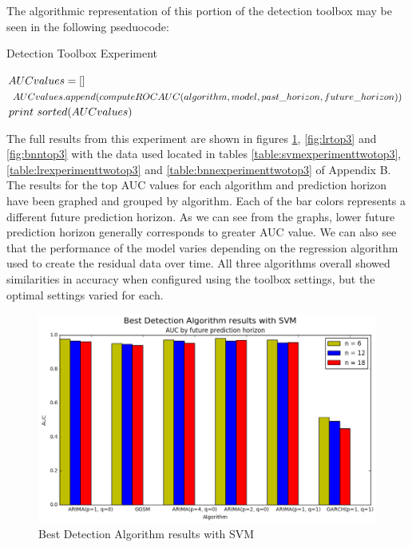 \documentclass{acm_proc_article-sp}
\begin{document}
The algorithmic representation of this portion of the detection toolbox may be seen in the following pseduocode:

\begin{algorithm}
	\caption{Detection Toolbox Experiment}
	\label{algo:experimenttwo}
	\begin{algorithmic}[1]
            \State $AUC\-values = []$
                       \State $AUC\-values.append(compute\-ROC\-AUC(algorithm, model, past\_horizon, future\_horizon))$
					\EndFor 
				\EndFor 
			\EndFor 
			\State $print\ sorted(AUC\-values)$
		\EndFor          
	\end{algorithmic}
\end{algorithm}

The full results from this experiment are shown in figures \ref{fig:svmtop3}, \ref{fig:lrtop3} and \ref{fig:bnntop3} with the data used located in tables \ref{table:svmexperimenttwotop3}, \ref{table:lrexperimenttwotop3} and \ref{table:bnnexperimenttwotop3} of Appendix B.
The results for the top AUC values for each algorithm and prediction horizon have been graphed and grouped by algorithm. Each of the bar colors represents a different future prediction horizon.  As we can see from the graphs, lower future prediction horizon generally corresponds to greater AUC value. We can also see that the performance of the model varies depending on the regression algorithm used to create the residual data over time. All three algorithms overall showed similarities in accuracy when configured using the toolbox settings, but the optimal settings varied for each.
\vspace{.15in}

\begin{figure}[!h]
\centering
    \includegraphics[scale=0.35]{figures/best_detection_svm.png}
\caption{Best Detection Algorithm results with SVM} 
\label{fig:svmtop3}
\end{figure}
\end{document}
